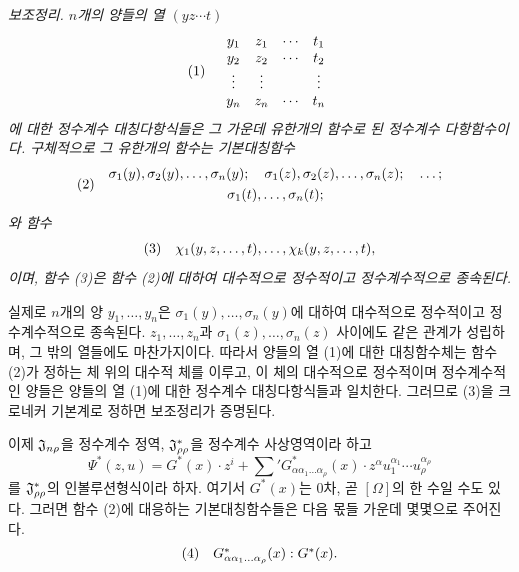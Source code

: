 \emph{보조정리. $n$개의 양들의 열 $(yz\cdots t)$}
\[
\begin{array}{@{}l@{\quad}c@{}}
(1)&
\begin{array}{cccc}
  y_1&z_1&\cdots&t_1\\
  y_2&z_2&\cdots&t_2\\
  \vdots&\vdots&&\vdots\\
  y_n&z_n&\cdots&t_n
\end{array}
\end{array}
\]
\emph{에 대한 정수계수 대칭다항식들은 그 가운데 유한개의 함수로 된 정수계수 다항함수이다. 구체적으로 그 유한개의 함수는 기본대칭함수}
\[
\begin{array}{@{}l@{\quad}c@{}}
(2)&
\begin{gathered}
  \sigma_1(y),\sigma_2(y),\ldots,\sigma_n(y);\quad
  \sigma_1(z),\sigma_2(z),\ldots,\sigma_n(z);\quad\ldots;\\
  \sigma_1(t),\ldots,\sigma_n(t);
\end{gathered}
\end{array}
\]
\emph{와 함수}
\[
\begin{array}{@{}l@{\quad}c@{}}
(3)&
  \chi_1(y,z,\ldots,t),\ldots,\chi_k(y,z,\ldots,t),
\end{array}
\]
\emph{이며, 함수 (3)은 함수 (2)에 대하여 대수적으로 정수적이고 정수계수적으로 종속된다.}

실제로 $n$개의 양 $y_1,\ldots,y_n$은 $\sigma_1(y),\ldots,\sigma_n(y)$에 대하여 대수적으로 정수적이고 정수계수적으로 종속된다. $z_1,\ldots,z_n$과 $\sigma_1(z),\ldots,\sigma_n(z)$ 사이에도 같은 관계가 성립하며, 그 밖의 열들에도 마찬가지이다. 따라서 양들의 열 (1)에 대한 대칭함수체는 함수 (2)가 정하는 체 위의 대수적 체를 이루고, 이 체의 대수적으로 정수적이며 정수계수적인 양들은 양들의 열 (1)에 대한 정수계수 대칭다항식들과 일치한다. 그러므로 (3)을 크로네커 기본계로 정하면 보조정리가 증명된다.

이제 $\mathfrak J_{n\rho}$을 정수계수 정역, $\mathfrak J^*_{\rho\rho}$을 정수계수 사상영역이라 하고
\[
  \Psi^*(z,u)=G^*(x)\cdot z^i+
  \sum{}'G^*_{\alpha\alpha_1\ldots\alpha_\rho}(x)\cdot
  z^\alpha u_1^{\alpha_1}\cdots u_\rho^{\alpha_\rho}
\]
를 $\mathfrak J^*_{\rho\rho}$의 인볼루션형식이라 하자. 여기서 $G^*(x)$는 0차, 곧 $[\Omega]$의 한 수일 수도 있다. 그러면 함수 (2)에 대응하는 기본대칭함수들은 다음 몫들 가운데 몇몇으로 주어진다.
\[
\begin{array}{@{}l@{\quad}c@{}}
(4)&
  G^*_{\alpha\alpha_1\ldots\alpha_\rho}(x):G^*(x).
\end{array}
\]


